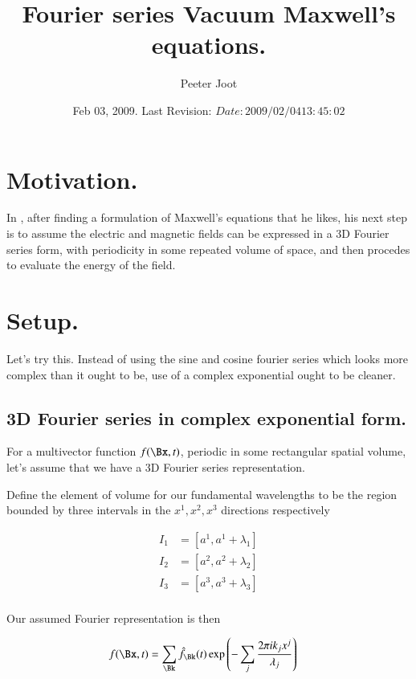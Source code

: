 \documentclass{article}
\title{ Fourier series Vacuum Maxwell's equations. }
\author{Peeter Joot}
\date{ Feb 03, 2009.  Last Revision: $Date: 2009/02/04 13:45:02 $ }
\begin{document}
\maketitle{}

\tableofcontents

\section{ Motivation. }

In \cite{bohm1989qt}, 
after finding a formulation of Maxwell's equations that he likes, his next
step is to assume the electric and magnetic fields can be expressed in 
a 3D Fourier series form, with periodicity in some repeated volume 
of space, and then procedes to evaluate the energy of the 
field.

\section{ Setup. }

Let's try this.  Instead of using the sine and cosine fourier series
which looks more complex than it ought to be, use of a complex exponential
ought to be cleaner.

\subsection{ 3D Fourier series in complex exponential form. }

For a multivector function $f(\Bx, t)$, periodic in some rectangular spatial volume, let's assume that we have a
3D Fourier series representation.

Define the element of volume for our fundamental wavelengths to be the region bounded by three intervals in the $x^1, x^2, x^3$ directions respectively

\begin{align*}
I_1 &= [ a^1, a^1 + \lambda_1 ] \\
I_2 &= [ a^2, a^2 + \lambda_2 ] \\
I_3 &= [ a^3, a^3 + \lambda_3 ] \\
\end{align*}

Our assumed Fourier representation is then

\begin{align*}
f(\Bx, t) &= \sum_{\Bk} \hat{f}_{\Bk}(t) \exp\left( - \sum_j \frac{2 \pi i k_j x^j}{\lambda_j} \right)
\end{align*}
\end{document}
